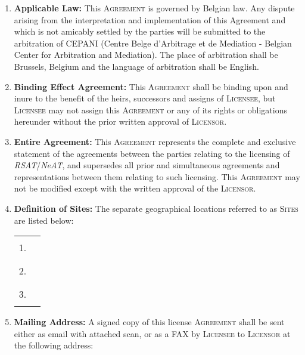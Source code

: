 \documentclass[12pt]{article}
\newcommand{\RSAT}[0]{\emph{RSAT}\xspace}
\newcommand{\NeAT}[0]{\emph{NeAT}\xspace}
\newcommand{\Licensor}[0]{\textsc{Licensor}\xspace}
\newcommand{\Licensee}[0]{\textsc{Licensee}\xspace}
\newcommand{\Agreement}[0]{\textsc{Agreement}\xspace}
\newcommand{\Sites}[0]{\textsc{Sites}\xspace}
\newcommand{\Fillline}[0]{\rule{10cm}{1pt}}
\newcommand{\Paragraph}[2]{\item \textbf{#1:} #2}
\begin{document}
\begin{enumerate}
{%
}

\Paragraph{Applicable Law}{This \Agreement is governed by Belgian law. Any
dispute arising from the interpretation and implementation of this
Agreement and which is not amicably settled by the parties will be
submitted to the arbitration of CEPANI (Centre Belge d'Arbitrage et de
Mediation - Belgian Center for Arbitration and Mediation). The place
of arbitration shall be Brussels, Belgium and the language of
arbitration shall be English.

}

\Paragraph{Binding Effect Agreement}{This \Agreement shall be binding 
upon and inure to the benefit of the heirs, successors and assigns of 
\Licensee, but \Licensee may not assign this \Agreement or any of its 
rights or obligations hereunder without the prior written approval of 
\Licensor.
}

\Paragraph{Entire Agreement}{This \Agreement represents the complete 
and exclusive statement of the agreements between the parties 
relating to the licensing of \RSAT/\NeAT, and supersedes all 
prior and simultaneous agreements and representations between them 
relating to such licensing. This \Agreement may not be modified except 
with the written approval of the \Licensor.
}

\Paragraph{Definition of Sites}{
The separate geographical locations 
referred to as \Sites are listed below:

\begin{center}
\begin{tabular}{ll}
1.&\Fillline\\[5mm]
2.&\Fillline\\[5mm]
3.&\Fillline
\end{tabular}
\end{center}
}
\label{DefSites}


\Paragraph{Mailing Address}{A signed copy of this license \Agreement
  shall be sent either as email with attached scan, or as a FAX by \Licensee to
  \Licensor at the following address:

}
\end{enumerate}
\end{document}
